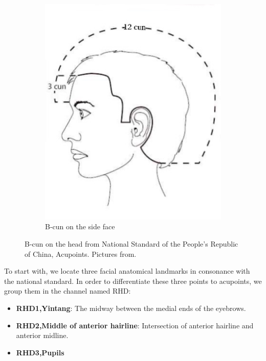 \begin{figure}
\begin{subfigure}[t]{0.45\columnwidth}
      \centering
      \includegraphics[width=\textwidth]{figures/b-cun.jpg}
      \caption{B-cun on the side face}
      \label{fig:cun-side}
  \end{subfigure}
  \vskip 0.15in
  \caption{B-cun on the head from National Standard of the People's Republic of China, Acupoints\protect\cite{jingxuebiaozhun}. Pictures from\protect\cite{musculoskeletalkey}.}
  \label{fig:cun}
\end{figure}
To start with, we locate three facial anatomical landmarks in consonance with the national standard. In order to differentiate these three points to acupoints, we group them in the channel named RHD:
\begin{itemize}
  \item \textbf{RHD1,Yintang}: The midway between the medial ends of the eyebrows.
  \item \textbf{RHD2,Middle of anterior hairline}: Intersection of anterior hairline and anterior midline.
  \item \textbf{RHD3,Pupils}
\end{itemize}


